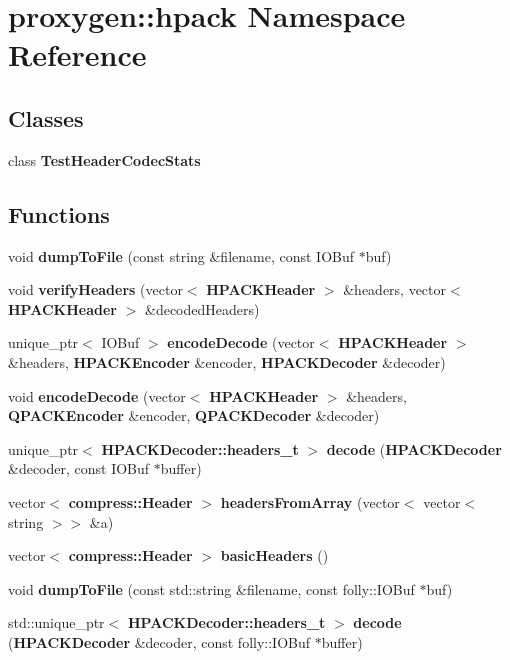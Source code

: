 \section{proxygen\+:\+:hpack Namespace Reference}
\label{namespaceproxygen_1_1hpack}
\subsection*{Classes}
\begin{DoxyCompactItemize}
\item 
class {\bf Test\+Header\+Codec\+Stats}
\end{DoxyCompactItemize}
\subsection*{Functions}
\begin{DoxyCompactItemize}
\item 
void {\bf dump\+To\+File} (const string \&filename, const I\+O\+Buf $\ast$buf)
\item 
void {\bf verify\+Headers} (vector$<$ {\bf H\+P\+A\+C\+K\+Header} $>$ \&headers, vector$<$ {\bf H\+P\+A\+C\+K\+Header} $>$ \&decoded\+Headers)
\item 
unique\+\_\+ptr$<$ I\+O\+Buf $>$ {\bf encode\+Decode} (vector$<$ {\bf H\+P\+A\+C\+K\+Header} $>$ \&headers, {\bf H\+P\+A\+C\+K\+Encoder} \&encoder, {\bf H\+P\+A\+C\+K\+Decoder} \&decoder)
\item 
void {\bf encode\+Decode} (vector$<$ {\bf H\+P\+A\+C\+K\+Header} $>$ \&headers, {\bf Q\+P\+A\+C\+K\+Encoder} \&encoder, {\bf Q\+P\+A\+C\+K\+Decoder} \&decoder)
\item 
unique\+\_\+ptr$<$ {\bf H\+P\+A\+C\+K\+Decoder\+::headers\+\_\+t} $>$ {\bf decode} ({\bf H\+P\+A\+C\+K\+Decoder} \&decoder, const I\+O\+Buf $\ast$buffer)
\item 
vector$<$ {\bf compress\+::\+Header} $>$ {\bf headers\+From\+Array} (vector$<$ vector$<$ string $>$$>$ \&a)
\item 
vector$<$ {\bf compress\+::\+Header} $>$ {\bf basic\+Headers} ()
\item 
void {\bf dump\+To\+File} (const std\+::string \&filename, const folly\+::\+I\+O\+Buf $\ast$buf)
\item 
std\+::unique\+\_\+ptr$<$ {\bf H\+P\+A\+C\+K\+Decoder\+::headers\+\_\+t} $>$ {\bf decode} ({\bf H\+P\+A\+C\+K\+Decoder} \&decoder, const folly\+::\+I\+O\+Buf $\ast$buffer)
\end{DoxyCompactItemize}



